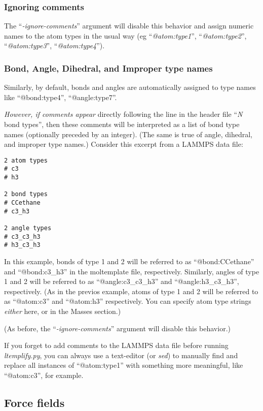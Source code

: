 \documentclass[11pt]{article}
\begin{document}
\subsubsection*{ Ignoring comments}

The ``\textit{-ignore-comments}'' argument will disable this behavior
and assign numeric names to the atom types in the usual way
(eg
``\textit{@atom:type1}'',
``\textit{@atom:type2}'',
``\textit{@atom:type3}'',
``\textit{@atom:type4}'').



\subsubsection*{ Bond, Angle, Dihedral, and Improper type names }

Similarly, by default, bonds and angles are automatically
assigned to type names like ``@bond:type4'',
``@angle:type7''.

\textit{However, if comments appear} directly following the line in the
header file ``\textit{N} bond types'', then these comments will be interpreted
as a list of bond type names (optionally preceded by an integer).
(The same is true of angle, dihedral, and improper type names.)
Consider this excerpt from a LAMMPS data file:
\begin{verbatim}
2 atom types
# c3
# h3

2 bond types
# CCethane
# c3_h3

2 angle types
# c3_c3_h3
# h3_c3_h3
\end{verbatim}

In this example, bonds of type 1 and 2 will be referred to as
``@bond:CCethane'' and ``@bond:c3\_h3''
in the moltemplate file, respectively.
Similarly, angles of type 1 and 2 will be referred to as
``@angle:c3\_c3\_h3'' and ``@angle:h3\_c3\_h3'', respectively.
(As in the previos example, atoms of type 1 and 2 will be referred to as
``@atom:c3'' and ``@atom:h3'' respectively.
You can specify atom type strings \textit{either} here,
or in the Masses section.)

(As before, the ``\textit{-ignore-comments}'' argument will disable this behavior.)

If you forget to add comments to the LAMMPS data file before running
\textit{ltemplify.py}, you can always use a text-editor (or \textit{sed})
to manually find and replace all instances of ``@atom:type1'' with something
more meaningful, like ``@atom:c3'', for example.


\subsection{ Force fields}
\label{sec:ltemplify_force_fields}
\end{document}

